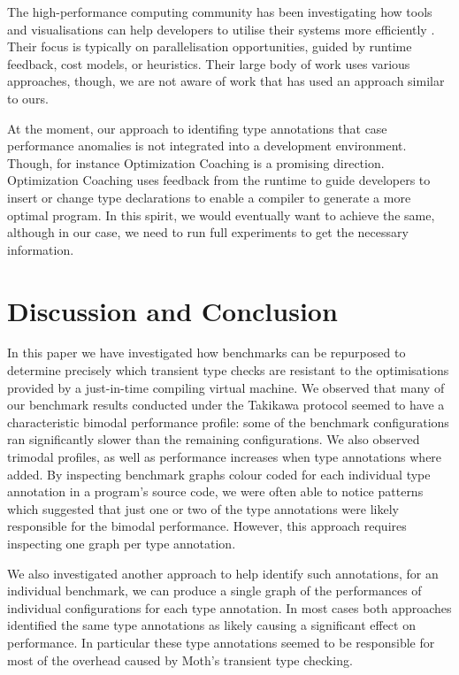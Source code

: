 \documentclass[sigplan,10pt,review,screen]{acmart}\settopmatter{printfolios=true}
\begin{document}
The high-performance computing community has been investigating how
tools and visualisations can help developers to utilise their systems
more efficiently \citep{Papenhausen:2016:IVT,daSilva:2019:PSV}.
Their focus is typically on parallelisation opportunities,
guided by runtime feedback, cost models, or heuristics. 
Their large body of work \citep{Isaacs:2014:PerfViz} uses various approaches,
though, we are not aware of work that has used an approach similar to ours.

At the moment, our approach to identifing type annotations that case
performance anomalies is not integrated into a development environment.
Though, for instance Optimization Coaching
\citep{St-Amour:2012:OCO} is a promising direction.
Optimization Coaching uses feedback from the runtime to guide developers
to insert or change type declarations 
to enable a compiler to generate a more optimal program.
In this spirit, we would eventually want to achieve the same, although
in our case,
we need to run full experiments to get the necessary information.


\section{Discussion and Conclusion}
\label{s-concl}

In this paper we have investigated how benchmarks can be
repurposed to determine precisely which transient type checks are
resistant to the optimisations provided by a just-in-time compiling
virtual machine.  We observed that many of our benchmark results
conducted under the Takikawa protocol 
seemed to have a characteristic bimodal performance profile: some
of the benchmark configurations ran significantly slower than
the remaining configurations. We also observed trimodal profiles, as well as performance increases when type annotations where added.
By inspecting benchmark graphs colour coded for each individual type annotation in a program's source code, we were often able to notice patterns which suggested
that just one or two of the type annotations were likely responsible for
the bimodal performance.
However, this approach requires inspecting one graph per type annotation.

We also investigated another approach to help identify such annotations, for an individual benchmark, we can produce a single graph of the performances of individual configurations for each type annotation. 
In most cases both approaches identified the same type annotations as likely causing a significant effect on performance. In particular these type annotations seemed to be responsible for most of the overhead caused by Moth's transient type checking.
\end{document}
